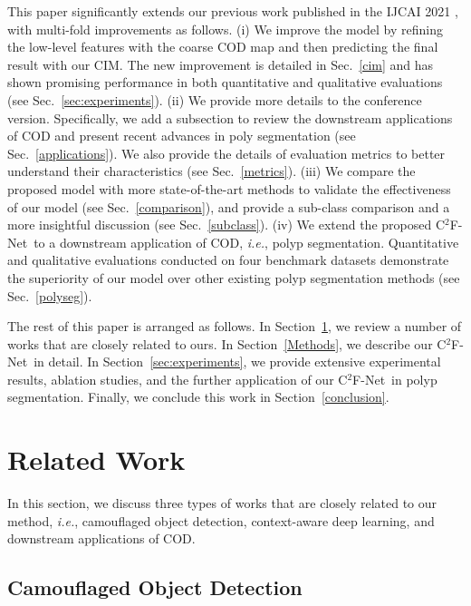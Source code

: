 \documentclass[lettersize,journal]{IEEEtran}
\newcommand{\ourM}{{C$^2$F-Net}}
\def\ie{\emph{i.e.}}
\begin{document}
This paper significantly extends our previous work published in the IJCAI 2021 \cite{c2f}, with multi-fold improvements as follows.
(i) We improve the model by refining the low-level features with the coarse COD map and then predicting the final result with our CIM. The new improvement is detailed in Sec.~\ref{cim} and has shown promising performance in both quantitative and qualitative evaluations (see Sec.~\ref{sec:experiments}).
(ii) We provide more details to the conference version. Specifically, we add a subsection to review the downstream applications of COD and present recent advances in poly segmentation (see Sec.~\ref{applications}). We also provide the details of evaluation metrics to better understand their characteristics (see Sec.~\ref{metrics}). 
(iii) We compare the proposed model with more state-of-the-art methods to validate the effectiveness of our model (see Sec.~\ref{comparison}), and provide a sub-class comparison and a more insightful discussion (see Sec.~\ref{subclass}).
(iv) We extend the proposed \ourM~to a downstream application of COD, \ie, polyp segmentation. Quantitative and qualitative evaluations conducted on four benchmark datasets demonstrate the superiority of our model over other existing polyp segmentation methods (see Sec.~\ref{polyseg}).

The rest of this paper is arranged as follows. In Section~\ref{related_work}, we review a number of works that are closely related to ours. In Section~\ref{Methods}, we describe our \ourM~in detail. In Section~\ref{sec:experiments}, we provide extensive experimental results, ablation studies, and the further application of our \ourM~in polyp segmentation. Finally, we conclude this work in Section~\ref{conclusion}.




\section{Related Work} \label{related_work}

In this section, we discuss three types of works that are closely related to our method, \ie, camouflaged object detection, context-aware deep learning, and downstream applications of COD.

\subsection{Camouflaged Object Detection}
\end{document}
